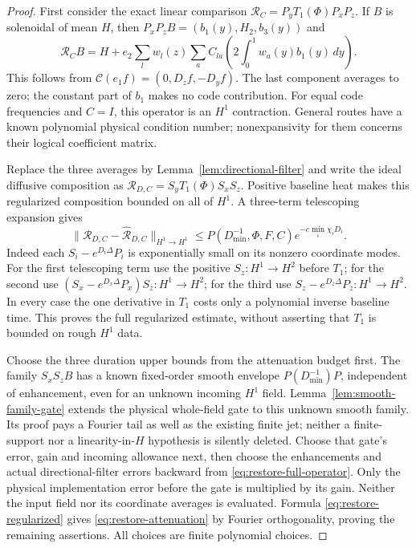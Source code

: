 \documentclass[11pt,a4paper]{amsart}
\theoremstyle{definition}
\theoremstyle{remark}
\numberwithin{equation}{section}
\newcommand{\norm}[1]{\lVert #1\rVert}
\begin{document}
\begin{proof}
First consider the exact linear comparison
$\mathcal R_C=P_yT_1(\Phi)P_xP_z$.  If $B$ is solenoidal of mean $H$,
then $P_xP_zB=(b_1(y),H_2,b_3(y))$ and
\begin{equation}\label{eq:restore-extraction}
 \mathcal R_CB=H+e_2\sum_lw_l(z)
       \sum_a C_{la}\left(2\int_0^1w_a(y)b_1(y)\,dy\right).
\end{equation}
This follows from
$\mathscr C(e_1f)=(0,D_zf,-D_yf)$.  The last component averages to zero;
the constant part of $b_1$ makes no code contribution.  For equal code
frequencies and $C=I$, this operator is an $H^1$ contraction.  General
routes have a known polynomial physical condition number; nonexpansivity
for them concerns their logical coefficient matrix.

Replace the three averages by Lemma~\ref{lem:directional-filter} and write
the ideal diffusive composition as
$\mathcal R_{D,C}=S_yT_1(\Phi)S_xS_z$.
Positive baseline heat makes this regularized composition bounded on all
of $H^1$.  A three-term telescoping expansion gives
\begin{equation}\label{eq:restore-full-operator}
 \norm{\mathcal R_{D,C}-\widehat{\mathcal R}_{D,C}}_{H^1\to H^1}
 \le P(D_{\min}^{-1},\Phi,F,C)
                  e^{-c\min_i\chi_iD_i}.
\end{equation}
Indeed each $S_i-e^{D_i\Delta}P_i$ is exponentially small on its nonzero
coordinate modes.  For the first telescoping term use the positive
$S_z:H^1\to H^2$ before $T_1$; for the second use
$(S_x-e^{D_x\Delta}P_x)S_z:H^1\to H^2$; for the third use
$S_z-e^{D_z\Delta}P_z:H^1\to H^2$.  In every case the one derivative in
$T_1$ costs only a polynomial inverse baseline time.  This proves the
full regularized estimate, without asserting that $T_1$ is bounded on
rough $H^1$ data.

Choose the three duration upper bounds from the attenuation budget first.
The family $S_xS_zB$ has a known fixed-order smooth envelope
$P(D_{\min}^{-1})P$, independent of enhancement, even for an unknown
incoming $H^1$ field. Lemma~\ref{lem:smooth-family-gate} extends the physical
whole-field gate to this unknown smooth family. Its proof pays a Fourier
tail as well as the existing finite jet; neither a finite-support nor a
linearity-in-$H$ hypothesis is silently deleted.
Choose that gate's error, gain and incoming allowance next, then choose
the enhancements and actual directional-filter errors backward from
\eqref{eq:restore-full-operator}.  Only the physical implementation error
before the gate is multiplied by its gain.  Neither the input field nor
its coordinate averages is evaluated.  Formula
\eqref{eq:restore-regularized} gives
\eqref{eq:restore-attenuation} by Fourier orthogonality, proving the
remaining assertions.  All choices are finite polynomial choices.
\end{proof}
\end{document}
